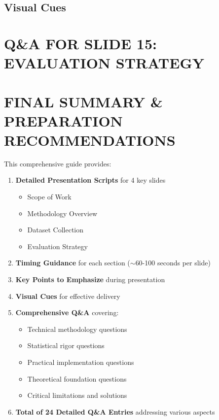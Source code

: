 \documentclass[11pt,a4paper]{article}
\begin{document}
\subsection{Visual Cues}

\section{Q\&A FOR SLIDE 15: EVALUATION STRATEGY}

\clearpage

\section*{FINAL SUMMARY \& PREPARATION RECOMMENDATIONS}

This comprehensive guide provides:

\begin{enumerate}
\item \textbf{Detailed Presentation Scripts} for 4 key slides
\begin{itemize}
\item Scope of Work
\item Methodology Overview
\item Dataset Collection
\item Evaluation Strategy
\end{itemize}

\item \textbf{Timing Guidance} for each section ($\sim$60-100 seconds per slide)

\item \textbf{Key Points to Emphasize} during presentation

\item \textbf{Visual Cues} for effective delivery

\item \textbf{Comprehensive Q\&A} covering:
\begin{itemize}
\item Technical methodology questions
\item Statistical rigor questions
\item Practical implementation questions
\item Theoretical foundation questions
\item Critical limitations and solutions
\end{itemize}

\item \textbf{Total of 24 Detailed Q\&A Entries} addressing various aspects
\end{enumerate}
\end{document}
